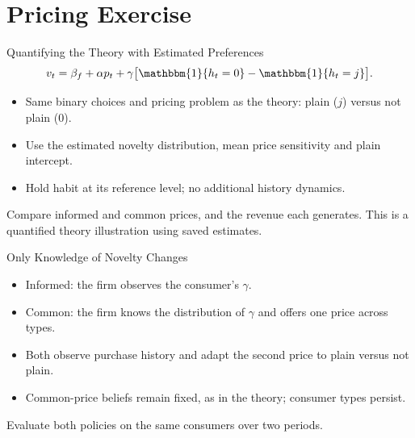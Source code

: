 \documentclass[aspectratio=169,professionalfonts]{beamer}
\newcommand{\shortbuttons}{}
\begin{document}
\section{Pricing Exercise}

\gdef\shortbuttons{}
\begin{frame}[label=short-34]{Quantifying the Theory with Estimated Preferences}
  \[
    v_t=\beta_f+\alpha p_t+\gamma\big[\mathbbm{1}\{h_t=0\}-\mathbbm{1}\{h_t=j\}\big].
  \]
  \begin{itemize}
    \item Same binary choices and pricing problem as the theory: plain ($j$) versus not plain ($0$).
    \item Use the estimated novelty distribution, mean price sensitivity and plain intercept.
    \item Hold habit at its reference level; no additional history dynamics.
  \end{itemize}
  \begin{tcolorbox}
    Compare informed and common prices, and the revenue each generates.
    This is a quantified theory illustration using saved estimates.
  \end{tcolorbox}
\end{frame}

\gdef\shortbuttons{}
\begin{frame}[label=short-40]{Only Knowledge of Novelty Changes}
  \begin{itemize}
    \item Informed: the firm observes the consumer's $\gamma$.
    \item Common: the firm knows the distribution of $\gamma$ and offers one price across types.
    \item Both observe purchase history and adapt the second price to plain versus not plain.
    \item Common-price beliefs remain fixed, as in the theory; consumer types persist.
  \end{itemize}
  \begin{tcolorbox}
    Evaluate both policies on the same consumers over two periods.
  \end{tcolorbox}
\end{frame}
\end{document}
